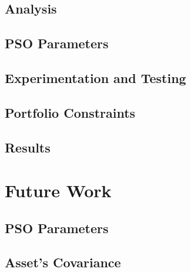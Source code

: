 \documentclass{pdfmx4020}
\begin{document}

  \section{Analysis} %
  \label{sec:analysis}
  

  \section{PSO Parameters} %
  \label{sec:pso_parameters}
  

  \section{Experimentation and Testing} %
  \label{sec:experimentation_and_testing}
  

  \section{Portfolio Constraints} %
  \label{sec:portfolio_constraints}
  

  \section{Results} %
  \label{sec:results}
  

\chapter{Future Work}
  \section{PSO Parameters} %
  \label{sec:parameters}
  

  \section{Asset's Covariance} %
  \label{sec:covariance}
  
\end{document}

